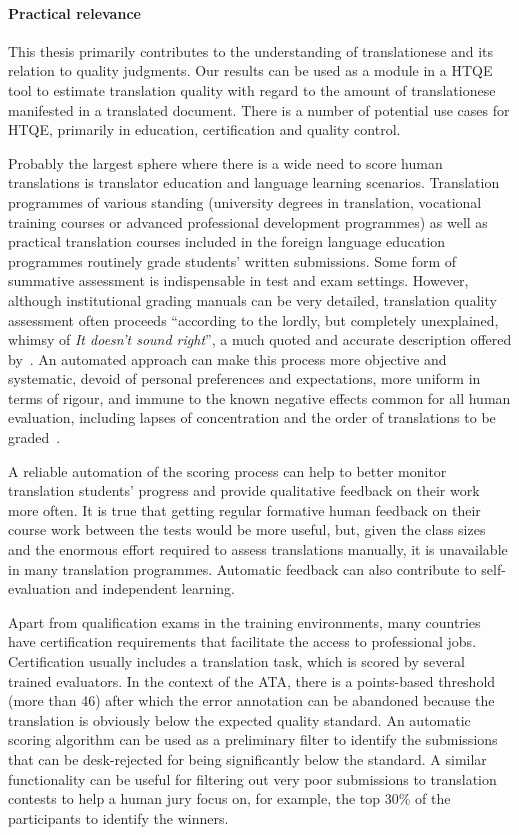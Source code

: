 \paragraph{Practical relevance} This thesis primarily contributes to the understanding of translationese and its relation to quality judgments. Our results can be used as a module in a \gls{HTQE} tool to estimate translation quality with regard to the amount of translationese manifested in a translated document. There is a number of potential use cases for \gls*{HTQE}, primarily in education, certification and quality control.

Probably the largest sphere where there is a wide need to score human translations is translator education and language learning scenarios. Translation programmes of various standing (university degrees in translation, vocational training courses or advanced professional development programmes) as well as practical translation courses included in the foreign language education programmes routinely grade students' written submissions. Some form of summative assessment is indispensable in test and exam settings. However, although institutional grading manuals can be very detailed, translation quality assessment often proceeds ``according to the lordly, but completely unexplained, whimsy of \textit{It doesn't sound right}'', a much quoted and accurate description offered by~\citet[p. 142]{Fawcett1981}. An automated approach can make this process more objective and systematic, devoid of personal preferences and expectations, more uniform in terms of rigour, and immune to the known negative effects common for all human evaluation, including lapses of concentration and the order of translations to be graded~\cite{MinacoriVibert2010}.    

A reliable automation of the scoring process can help to better monitor translation students' progress and provide qualitative feedback on their work more often. It is true that getting regular formative human feedback on their course work between the tests would be more useful, but, given the class sizes and the enormous effort required to assess translations manually, it is unavailable in many translation programmes.
Automatic feedback can also contribute to self-evaluation and independent learning. 

Apart from qualification exams in the training environments, many countries have certification requirements that facilitate the access to professional jobs. Certification usually includes a translation task, which is scored by several trained evaluators. In the context of the \gls{ATA}, there is a points-based threshold (more than 46) after which the error annotation can be abandoned because the translation is obviously below the expected quality standard. An automatic scoring algorithm can be used as a preliminary filter to identify the submissions that can be desk-rejected for being significantly below the standard. A similar functionality can be useful for filtering out very poor submissions to translation contests to help a human jury focus on, for example, the top 30\% of the participants to identify the winners. 

